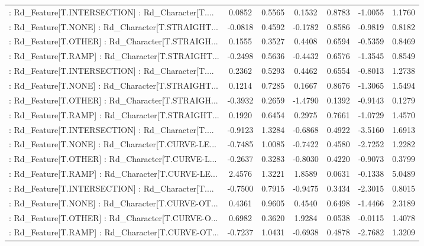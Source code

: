 \begin{longtable}{p{4cm}cccccc}
 : Rd\_Feature[T.INTERSECTION] : Rd\_Character[T.... &  0.0852 &    0.5565 &  0.1532 &       0.8783 & -1.0055 &  1.1760 \\
 : Rd\_Feature[T.NONE] : Rd\_Character[T.STRAIGHT... & -0.0818 &    0.4592 & -0.1782 &       0.8586 & -0.9819 &  0.8182 \\
 : Rd\_Feature[T.OTHER] : Rd\_Character[T.STRAIGH... &  0.1555 &    0.3527 &  0.4408 &       0.6594 & -0.5359 &  0.8469 \\
 : Rd\_Feature[T.RAMP] : Rd\_Character[T.STRAIGHT... & -0.2498 &    0.5636 & -0.4432 &       0.6576 & -1.3545 &  0.8549 \\
 : Rd\_Feature[T.INTERSECTION] : Rd\_Character[T.... &  0.2362 &    0.5293 &  0.4462 &       0.6554 & -0.8013 &  1.2738 \\
 : Rd\_Feature[T.NONE] : Rd\_Character[T.STRAIGHT... &  0.1214 &    0.7285 &  0.1667 &       0.8676 & -1.3065 &  1.5494 \\
 : Rd\_Feature[T.OTHER] : Rd\_Character[T.STRAIGH... & -0.3932 &    0.2659 & -1.4790 &       0.1392 & -0.9143 &  0.1279 \\
 : Rd\_Feature[T.RAMP] : Rd\_Character[T.STRAIGHT... &  0.1920 &    0.6454 &  0.2975 &       0.7661 & -1.0729 &  1.4570 \\
 : Rd\_Feature[T.INTERSECTION] : Rd\_Character[T.... & -0.9123 &    1.3284 & -0.6868 &       0.4922 & -3.5160 &  1.6913 \\
 : Rd\_Feature[T.NONE] : Rd\_Character[T.CURVE-LE... & -0.7485 &    1.0085 & -0.7422 &       0.4580 & -2.7252 &  1.2282 \\
 : Rd\_Feature[T.OTHER] : Rd\_Character[T.CURVE-L... & -0.2637 &    0.3283 & -0.8030 &       0.4220 & -0.9073 &  0.3799 \\
 : Rd\_Feature[T.RAMP] : Rd\_Character[T.CURVE-LE... &  2.4576 &    1.3221 &  1.8589 &       0.0631 & -0.1338 &  5.0489 \\
 : Rd\_Feature[T.INTERSECTION] : Rd\_Character[T.... & -0.7500 &    0.7915 & -0.9475 &       0.3434 & -2.3015 &  0.8015 \\
 : Rd\_Feature[T.NONE] : Rd\_Character[T.CURVE-OT... &  0.4361 &    0.9605 &  0.4540 &       0.6498 & -1.4466 &  2.3189 \\
 : Rd\_Feature[T.OTHER] : Rd\_Character[T.CURVE-O... &  0.6982 &    0.3620 &  1.9284 &       0.0538 & -0.0115 &  1.4078 \\
 : Rd\_Feature[T.RAMP] : Rd\_Character[T.CURVE-OT... & -0.7237 &    1.0431 & -0.6938 &       0.4878 & -2.7682 &  1.3209 \\

\end{longtable}
